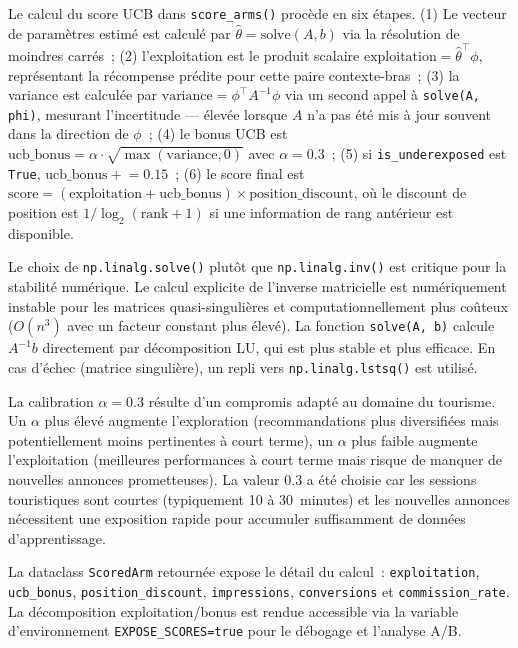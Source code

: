 Le calcul du score UCB dans \texttt{score\_arms()} procède en six étapes. (1) Le vecteur de
paramètres estimé est calculé par $\hat{\theta} = \text{solve}(A, b)$ via la résolution de
moindres carrés~; (2) l'exploitation est le produit scalaire
$\text{exploitation} = \hat{\theta}^\top \phi$, représentant la récompense prédite pour cette
paire contexte-bras~; (3) la variance est calculée par
$\text{variance} = \phi^\top A^{-1} \phi$ via un second appel à \texttt{solve(A, phi)},
mesurant l'incertitude --- élevée lorsque $A$ n'a pas été mis à jour souvent dans la direction
de $\phi$~; (4) le bonus UCB est
$\text{ucb\_bonus} = \alpha \cdot \sqrt{\max(\text{variance}, 0)}$ avec
$\alpha = 0.3$~; (5) si \texttt{is\_underexposed} est \texttt{True},
$\text{ucb\_bonus} \mathrel{+}= 0.15$~; (6) le score final est
$\text{score} = (\text{exploitation} + \text{ucb\_bonus}) \times
\text{position\_discount}$, où le discount de position est
$1 / \log_2(\text{rank} + 1)$ si une information de rang antérieur est disponible.

Le choix de \texttt{np.linalg.solve()} plutôt que \texttt{np.linalg.inv()} est critique
pour la stabilité numérique. Le calcul explicite de l'inverse matricielle est numériquement
instable pour les matrices quasi-singulières et computationnellement plus coûteux ($O(n^3)$
avec un facteur constant plus élevé). La fonction \texttt{solve(A, b)} calcule $A^{-1}b$
directement par décomposition LU, qui est plus stable et plus efficace. En cas d'échec
(matrice singulière), un repli vers \texttt{np.linalg.lstsq()} est utilisé.

La calibration $\alpha = 0.3$ résulte d'un compromis adapté au domaine du tourisme. Un $\alpha$
plus élevé augmente l'exploration (recommandations plus diversifiées mais potentiellement moins
pertinentes à court terme), un $\alpha$ plus faible augmente l'exploitation (meilleures
performances à court terme mais risque de manquer de nouvelles annonces prometteuses). La
valeur 0.3 a été choisie car les sessions touristiques sont courtes (typiquement 10 à
30~minutes) et les nouvelles annonces nécessitent une exposition rapide pour accumuler
suffisamment de données d'apprentissage.

La dataclass \texttt{ScoredArm} retournée expose le détail du calcul~:
\texttt{exploitation}, \texttt{ucb\_bonus}, \texttt{position\_discount}, \texttt{impressions},
\texttt{conversions} et \texttt{commission\_rate}. La décomposition
exploitation/bonus est rendue accessible via la variable d'environnement
\texttt{EXPOSE\_SCORES=true} pour le débogage et l'analyse A/B.


